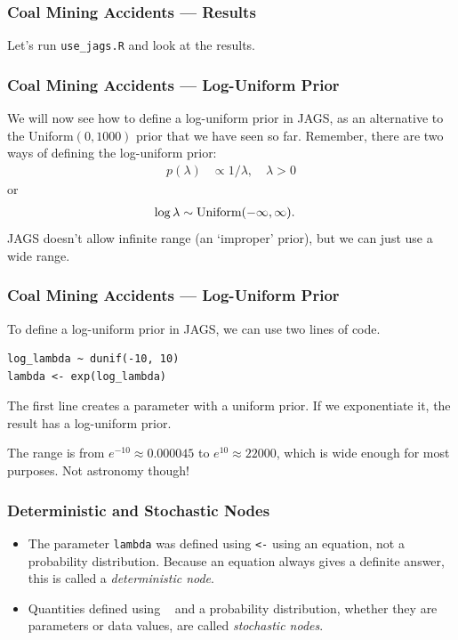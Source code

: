 \documentclass{beamer}
\begin{document}
\begin{frame}[fragile]
\frametitle{Coal Mining Accidents --- Results}
Let's run \texttt{use\_jags.R} and look at the results.

\end{frame}



\begin{frame}
\frametitle{Coal Mining Accidents --- Log-Uniform Prior}
We will now see how to define a log-uniform prior in JAGS,
as an alternative to the Uniform$(0, 1000)$ prior that we have
seen so far. Remember, there are two ways of defining the
log-uniform prior:\pause
\begin{align}
p(\lambda) &\propto 1/\lambda, \quad \lambda > 0
\end{align}
\pause
or
\begin{align}
\log \lambda &\sim \textnormal{Uniform}(-\infty, \infty).
\end{align}
\pause
JAGS doesn't allow infinite range (an `improper' prior),
but we can just use a wide range.

\end{frame}


\begin{frame}[fragile]
\frametitle{Coal Mining Accidents --- Log-Uniform Prior}
To define a log-uniform prior in JAGS, we can use two lines of code.
\begin{verbatim}
log_lambda ~ dunif(-10, 10)
lambda <- exp(log_lambda)
\end{verbatim}
\pause

The first line creates a parameter with a uniform prior. If
we exponentiate it, the result has a log-uniform prior.\pause

The range is from $e^{-10} \approx 0.000045$ to $e^{10} \approx 22000$,
which is wide enough for most purposes. Not astronomy though!
\end{frame}


\begin{frame}[fragile]
\frametitle{Deterministic and Stochastic Nodes}
\begin{itemize}
\item The parameter \texttt{lambda} was defined using \texttt{<-}
using an equation, not a probability distribution. Because an equation always
gives a definite answer, this is called a {\em deterministic node}. \pause
\item Quantities defined using \texttt{~} and a probability distribution,
whether they are parameters or data values, are called
{\em stochastic nodes}.
\end{itemize}
\end{frame}
\end{document}

